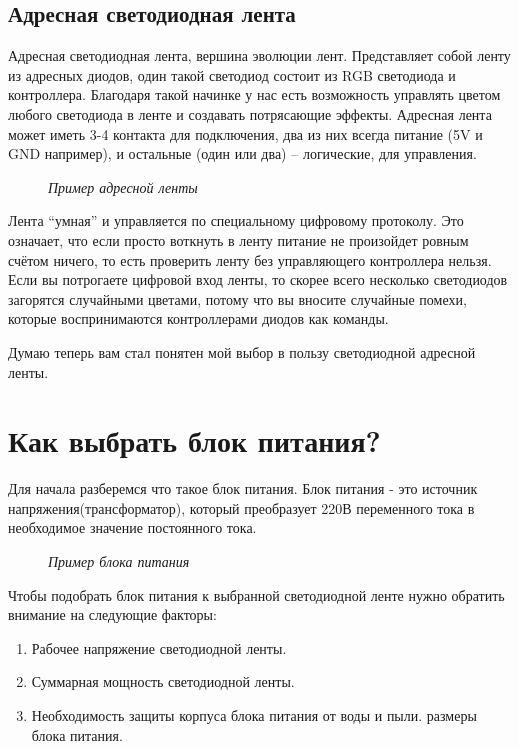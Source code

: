 \documentclass[a4paper, 12pt]{article}
\newcommand{\image}[3]{\begin{figure}[h!]\center{\texttt{[image: \#1]} }\caption{\textit{#3}}\end{figure}}
\begin{document}
\newpage

\subsection{Адресная светодиодная лента}
Адресная светодиодная лента, вершина эволюции лент. Представляет собой ленту из
адресных диодов, один такой светодиод состоит из RGB светодиода и контроллера.
Благодаря такой начинке у нас есть возможность управлять цветом любого 
светодиода в ленте и создавать потрясающие эффекты. Адресная лента может иметь 
3-4 контакта для подключения, два из них всегда питание (5V и GND например), и 
остальные (один или два) – логические, для управления.

\image{Адресная_светодиодная_лента.jpg}{230}{Пример адресной ленты}

Лента “умная” и управляется по специальному цифровому протоколу. Это означает, 
что если просто воткнуть в ленту питание не произойдет ровным счётом ничего, то
есть проверить ленту без управляющего контроллера нельзя. Если вы потрогаете 
цифровой вход ленты, то скорее всего несколько светодиодов загорятся 
случайными цветами, потому что вы вносите случайные помехи, которые 
воспринимаются контроллерами диодов как команды. 

Думаю теперь вам стал понятен мой выбор в пользу светодиодной адресной ленты.

\newpage

\section{Как выбрать блок питания?}

Для начала разберемся что такое блок питания.
Блок питания - это источник напряжения(трансформатор), который преобразует 220В
переменного тока в необходимое значение постоянного тока. 

\image{блок_питания.jpg}{150}{Пример блока питания}

Чтобы подобрать блок питания к выбранной светодиодной ленте нужно обратить 
внимание на следующие факторы:

\begin{enumerate}
\item Рабочее напряжение светодиодной ленты.
\item Суммарная мощность светодиодной ленты.
\item Необходимость защиты корпуса блока питания от воды и пыли.
 размеры блока питания.
\end{enumerate}
\end{document}
